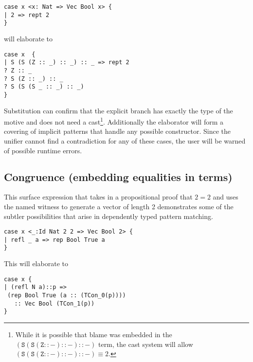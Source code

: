 \begin{lstlisting}[basicstyle={\ttfamily\small}]
case x <x: Nat => Vec Bool x> {
| 2 => rept 2
}
\end{lstlisting}
 
will elaborate to
\begin{lstlisting}[basicstyle={\ttfamily\small}]
case x  {
| S (S (Z :: _) :: _) :: _ => rept 2
? Z :: _
? S (Z :: _) :: _
? S (S (S _ :: _) :: _)
}
\end{lstlisting}
 
Substitution can confirm that the explicit branch has exactly the type of the motive and does not need a cast\footnote{
  While it is possible that blame was embedded in the $\mathtt{(S (S (Z :: -) :: -) :: -)}$ term, the cast system will allow $\mathtt{(S (S (Z :: -) :: -) :: -)}\equiv2$.}.
Additionally the elaborator will form a covering of implicit patterns that handle any possible constructor.
Since the unifier cannot find a contradiction for any of these cases, the user will be warned of possible runtime errors.
 
\subsection{Congruence (embedding equalities in terms)}
This surface expression that takes in a propositional proof that $2=2$ and uses the named witness to generate a vector of length 2 demonstrates some of the subtler possibilities that arise in dependently typed pattern matching.
 
\begin{lstlisting}[basicstyle={\ttfamily\small}]
case x <_:Id Nat 2 2 => Vec Bool 2> {
| refl _ a => rep Bool True a
}
\end{lstlisting}
 
This will elaborate to
 
\begin{lstlisting}[basicstyle={\ttfamily\small}]
case x {
| (refl N a)::p =>
 (rep Bool True (a :: (TCon_0(p)))) 
   :: Vec Bool (TCon_1(p))
}
\end{lstlisting}
 
